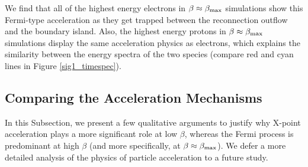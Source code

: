 We find that all of the highest energy electrons in $\beta\approx \beta_{\rm max}$ simulations show this Fermi-type acceleration as they get trapped between the reconnection outflow and the boundary island. Also,  the highest energy protons in  $\beta\approx \beta_{\rm max}$ simulations display the same acceleration physics as electrons, which explains the similarity between the energy spectra of the two species (compare red and cyan lines in Figure \ref{sig1_timespec}).





\subsection{Comparing the Acceleration Mechanisms}
In this Subsection, we present a few qualitative arguments to justify why X-point acceleration plays a more significant role at low $\beta$, whereas the Fermi process is predominant at high $\beta$ (and more specifically, at $\beta\approx \beta_{\rm max}$). We defer a more detailed analysis of the physics of particle acceleration to a future study.

